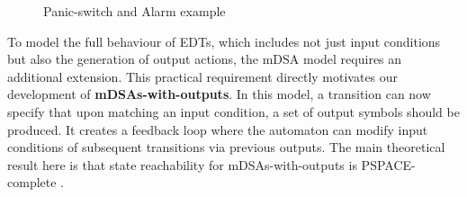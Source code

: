   \begin{figure}
  \centering
  \caption{Panic-switch and Alarm example}
  \label{fig:alarm-example}
  \end{figure}


To model the full behaviour of EDTs, which includes not just input conditions but also the generation of output actions, the mDSA model requires an additional extension. This practical requirement directly motivates our development of \textbf{mDSAs-with-outputs}.
 In this model, a transition can now specify that upon matching an input condition, a set of output symbols should be produced. It creates a feedback loop where the automaton can modify input conditions of subsequent transitions via previous outputs. The main theoretical result here is that state reachability for mDSAs-with-outputs is {PSPACE-complete} \cite{Keerthan2025netys}.

